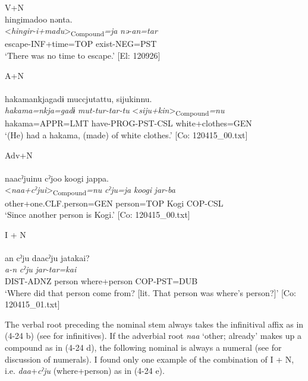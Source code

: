 \ex  V+N\\
\glll    hingimadoo  nənta.\\
      <\textit{hingir-i+madu}>\textsubscript{Compound}\textit{=ja}  \textit{nə-an=tar}\\
      escape-INF+time=TOP  exist-NEG=PST\\
      \glt       ‘There was no time to escape.’ [El: 120926]

\ex A+N\\\\
\glll   hakamankjagadɨ  muccjutattu,  sijukinnu.\\
      \textit{hakama=nkja=gadɨ}  \textit{mut-tur-tar-tu}  <\textit{siju+kin}>\textsubscript{Compound}\textit{=nu}\\
      hakama=APPR=LMT  have-PROG-PST-CSL  white+clothes=GEN\\
      \glt       ‘(He) had a hakama, (made) of white clothes.’ [Co: 120415\_00.txt]

\ex Adv+N\\\\
\glll     naacˀjuinu  cˀjoo  koogi  jappa.\\
      <\textit{naa+cˀjui}>\textsubscript{Compound}\textit{=nu}  \textit{cˀju=ja}  \textit{koogi}  \textit{jar-ba}\\
      other+one.CLF.person=GEN  person=TOP  Kogi  COP-CSL\\
      \glt       ‘Since another person is Kogi.’ [Co: 120415\_00.txt]

\ex I + N\\\\
\glll      an  cˀju  daacˀju  jatakai?\\
      \textit{a-n}  \textit{cˀju}  \textit{}  \textit{jar-tar=kai}\\
      DIST-ADNZ  person  where+person  COP-PST=DUB\\
      \glt       ‘Where did that person come from? [lit. That person was where’s person?]’ [Co: 120415\_01.txt]
    \z
\z

The verbal root preceding the nominal stem always takes the infinitival affix as in (4-24 b) (see  for infinitives). If the adverbial root \textit{naa} ‘other; already’ makes up a compound as in (4-24 d), the following nominal is always a numeral (see  for discussion of numerals). I found only one example of the combination of I + N, i.e. \textit{daa}+\textit{cˀju} (where+person) as in (4-24 e).

